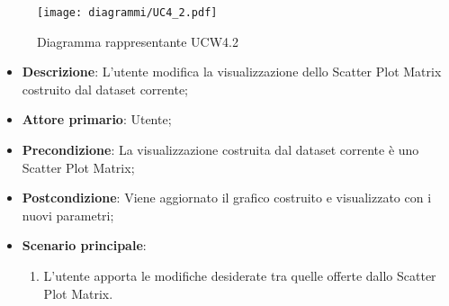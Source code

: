 \begin{figure}[h]
    \centering
    \texttt{[image: diagrammi/UC4\_2.pdf]}
    \caption{Diagramma rappresentante UCW4.2}
    \label{fig:UCW4.2}
\end{figure}


\begin{itemize}
    \item \textbf{Descrizione}: L’utente modifica la visualizzazione dello Scatter Plot Matrix
                                costruito dal dataset corrente;

    \item \textbf{Attore primario}: Utente;

    \item \textbf{Precondizione}:   La visualizzazione costruita dal dataset corrente è uno Scatter Plot Matrix;

    \item \textbf{Postcondizione}:  Viene aggiornato il grafico costruito e visualizzato con i nuovi parametri;

	\item \textbf{Scenario principale}:
		\begin{enumerate}
            \item L'utente apporta le modifiche desiderate tra quelle offerte dallo Scatter Plot Matrix.
        \end{enumerate}
\end{itemize}



